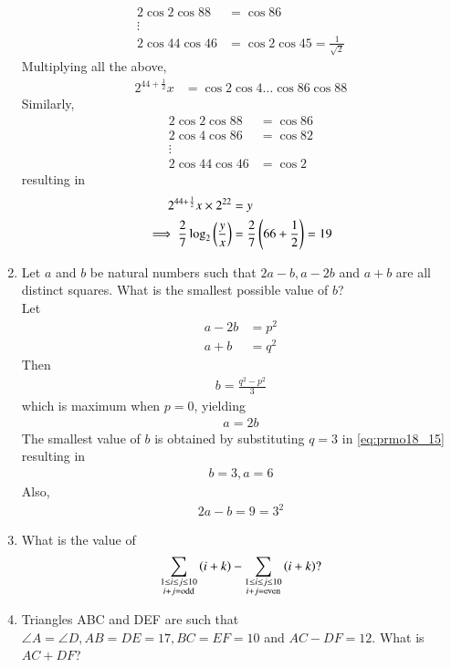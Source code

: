 \documentclass[journal,12pt,twocolumn]{IEEEtran}
\renewcommand\thesection{\arabic{section}}
\begin{document}
\begin{enumerate}[label=\thesection.\arabic*,ref=\thesection.\theenumi]
\begin{align}
\\
2\cos 2 \cos 88 &= \cos 86
\\
\vdots
\\
2\cos 44 \cos 46 &= \cos 2
\cos 45 = \frac{1}{\sqrt{2}}
\end{align}
%
Multiplying all the above, 
\begin{align}
2^{44+\frac{1}{2}} x &= \cos 2 \cos 4 \dots \cos 86 \cos 88
\end{align}
Similarly,
\begin{align}
2\cos 2 \cos 88 &= \cos 86
\\
2\cos 4 \cos 86 &= \cos 82
\\
\vdots
\\
2\cos 44 \cos 46 &= \cos 2
\end{align}
resulting in 
\begin{align}
2^{44+\frac{1}{2}} x \times 2^{22} &= y
\\
\implies \frac{2}{7}\log_2\left(\frac{y}{x}\right) &=\frac{2}{7}\left(66+\frac{1}{2}\right) = 19
\end{align}
\item Let $a$ and $b$ be natural numbers such that $2a- b, a-2b$ and $a+b$ 
 are all distinct squares. What is the smallest possible value of $b$? 
\\ Let 
\begin{align}
a-2b &=p^2
\\
a+b &=q^2
\end{align}
%
Then 
\begin{align}
\label{eq:prmo18_15}
b = \frac{q^2-p^2}{3}
\end{align}
%
which is maximum when $p = 0$, yielding
\begin{align}
a = 2b
\end{align}
%
The smallest value of $b$ is obtained by substituting $q = 3$ in \eqref{eq:prmo18_15} resulting in
\begin{align}
b =3, a = 6
\end{align}
%
Also,
\begin{align}
2a-b =9=3^2
\end{align}
\solution 
\item What is the value of
\begin{align}
\sum_{\substack{1 \le i \le j \le 10\\i+j=\text{odd}}}\left(i+k\right)
-\sum_{\substack{1 \le i \le j \le 10\\i+j=\text{even}}}\left(i+k\right)?
\end{align}
\item Triangles ABC and DEF are such that $\angle A = \angle D, AB = DE = 17, BC = EF = 10$ and $AC -DF = 12$. What is $AC +DF$? 

\end{enumerate}
\end{document}
